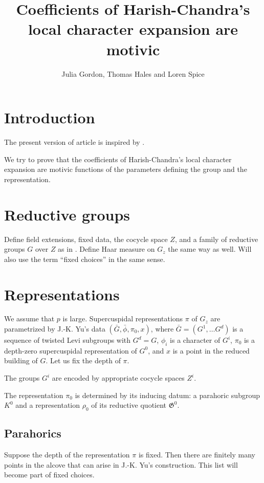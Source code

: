 \documentclass[12pt]{amsart}
\title{Coefficients of Harish-Chandra's local character expansion are motivic}
\author{Julia Gordon, Thomas Hales and Loren Spice}
\newcommand{\fG}{\mathfrak G}
\theoremstyle{plain}
\theoremstyle{definition}
\begin{document}

\maketitle

\section{Introduction}
The present version of article is inspired by \cite{unsuccessful self-treatment of writer's block}. 
 
We try to prove that the coefficients of Harish-Chandra's local character expansion are motivic functions of the parameters defining the group and the representation. 

\section{Reductive groups}
Define field extensions, fixed data, the cocycle space $Z$, and a family of reductive groups $G$ over $Z$ as in \cite{transfer transfer}. Define Haar measure on $G_z$ the same way as well.
Will also use the term ``fixed choices'' in the same sense. 

\section{Representations}
We assume that $p$ is large. 
Supercuspidal representations $\pi$ of $G_z$ are parametrized by J.-K. Yu's data 
$(\bar G, \bar\phi, \pi_0, x)$, where $\bar G=(G^1, \dots G^d)$ is a sequence of twisted Levi subgroups with $G^d=G$, $\phi_i$ is a character of $G^i$, $\pi_0$ is a depth-zero supercuspidal representation of $G^0$, and $x$ is a point in the reduced building of $G$.
Let us fix the depth of $\pi$. 

The groups $G^i$ are encoded by appropriate  cocycle spaces $Z^i$.

The representation $\pi_0$ is determined by its inducing datum: a parahoric subgroup $K^0$ and a representation $\rho_0$ of its reductive quotient $\fG^0$. 

\subsection{Parahorics} Suppose the depth of the representation $\pi$ is fixed. Then there are finitely many points in the alcove that can arise in J.-K. Yu's construction. This list will become part of fixed choices. 
\end{document}
